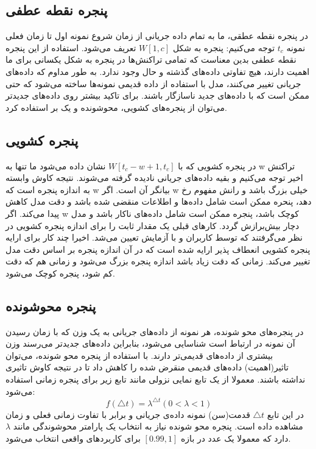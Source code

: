 \subsection{پنجره نقطه عطفی}
در پنجره نقطه عطقی، ما به تمام داده جریانی از زمان شروع نمونه اول تا زمان فعلی نمونه $ t_c $ توجه می‌کنیم: پنجره به شکل $ W[1, c] $ تعریف می‌شود. استفاده از این پنجره نقطه عطفی بدین معناست که تمامی تراکنش‌ها در پنجره به شکل یکسانی برای ما اهمیت دارند، هیچ تفاوتی داده‌های گذشته و حال وجود ندارد. به طور مداوم که داده‌های جریانی تغییر می‌کنند، مدل با استفاده از داده قدیمی نمونه‌ها ساخته می‌شود که حتی ممکن است که با داده‌های جدید ناسازگار باشند. برای تاکید بیشتر روی داده‌های جدیدتر می‌توان از پنجره‌های کشویی، محوشونده و یک بر استفاده کرد.
\subsection{پنجره کشویی}
   در پنجره کشویی که با
$W[t_c - w + 1, t_c]$
 نشان داده می‌شود ما تنها به w تراکنش اخیر توجه می‌کنیم و بقیه داده‌های جریانی نادیده گرفته‌ می‌شوند. نتیجه کاوش وابسته به اندازه پنجره است که w بیانگر آن است. اگر w خیلی بزرگ باشد و رانش مفهوم رخ دهد، پنحره ممکن است شامل داده‌‌ها و اطلاعات منقضی شده باشد و دقت مدل کاهش پیدا می‌کند. اگر w کوچک باشد، پنجره ممکن است شامل داده‌های ناکار باشد و مدل دچار بیش‌برازش گردد.
کارهای قبلی یک مقدار ثابت را برای اندازه پنجره کشویی در نظر‌ می‌گرفتند که توسط کاربران و با آزمایش تعیین می‌شد. اخیرا چند کار برای ارایه پنجره کشویی انعطاف پذیر ارایه شده است که در آن اندازه پنجره بر اساس دقت مدل تغییر می‌کند. زمانی که دقت زیاد باشد اندازه پنجره بزرگ می‌شود و زمانی هم که دقت کم شود، پنجره کوچک می‌شود.

\subsection{پنجره محوشونده}
در پنجره‌های محو شونده، هر نمونه از داده‌های جریانی به یک وزن که با زمان رسیدن آن نمونه در ارتباط است شناسایی می‌شود، بنابراین داده‌های جدیدتر می‌رسند وزن بیشتری از داده‌های قدیمی‌تر دارند. با استفاده از پنجره محو شونده، می‌توان تاثیر(اهمیت) داده‌های قدیمی منقرض شده را کاهش داد تا در نتیجه کاوش تاثیری نداشته باشند. معمولا از یک تابع نمایی نزولی مانند تابع زیر برای پنجره زمانی استفاده می‌شود:
\begin{equation}
f(\triangle t) = \lambda^{\triangle t}(0 < \lambda < 1)
\end{equation}
در این تابع $\triangle t$ قدمت(سن) نمونه داده‌ی جریانی و برابر با تفاوت زمانی فعلی و زمان مشاهده داده است. پنجره محو شونده نیاز به انتخاب یک پارامتر محوشوندگی مانند $ \lambda $ دارد که معمولا یک عدد در بازه $ [0.99, 1] $ برای کاربردهای واقعی انتخاب می‌شود.

